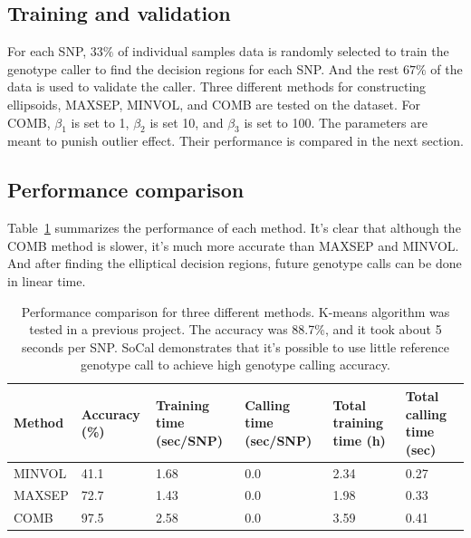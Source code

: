 \documentclass{scrartcl}
\begin{document}
\subsection{Training and validation}

\par
For each SNP, $33\%$ of individual samples data is randomly selected to train
the genotype caller to find the decision regions for each SNP.
And the rest $67\%$ of the data is used to validate the caller.
Three different methods for constructing ellipsoids, MAXSEP, MINVOL, and COMB
are tested on the dataset.
For COMB, $\beta_{1}$ is set to 1, $\beta_{2}$ is set 10, and $\beta_{3}$
is set to 100.
The parameters are meant to punish outlier effect.
Their performance is compared in the next section.

\subsection{Performance comparison}

Table~\ref{table:result_perfcmp} summarizes the performance of each method.
It's clear that although the COMB method is slower, it's much more accurate
than MAXSEP and MINVOL.
And after finding the elliptical decision regions, future genotype calls can be
done in linear time.
\begin{table}[H]
\centering
\begin{tabular}{|p{1.5cm}|p{1.5cm}|p{1.5cm}|p{1.5cm}|p{1.5cm}|p{1.5cm}|}
    \hline
    Method  & Accuracy (\%) & Training time (sec/SNP)
    & Calling time (sec/SNP) & Total training time (h)
    & Total calling time (sec)\\ \hline
    MINVOL  & 41.1          & 1.68 & 0.0 & 2.34 & 0.27 \\ \hline
    MAXSEP  & 72.7          & 1.43 & 0.0 & 1.98 & 0.33 \\ \hline  
    COMB    & 97.5          & 2.58 & 0.0 & 3.59 & 0.41 \\ \hline
\end{tabular}
\caption{Performance comparison for three different methods. K-means
algorithm was tested in a previous project.
The accuracy was 88.7\%, and it took about 5 seconds per SNP.
SoCal demonstrates that it's possible to use little
reference genotype call to achieve high genotype calling accuracy.}
\label{table:result_perfcmp}
\end{table}
\end{document}
